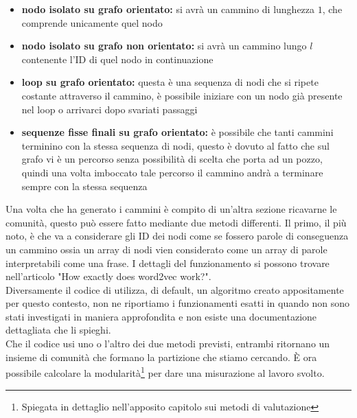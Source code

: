 \begin{itemize}
	\item \textbf{nodo isolato su grafo orientato:} si avrà un cammino di lunghezza $1$, che comprende unicamente quel nodo
	\item \textbf{nodo isolato su grafo non orientato:} si avrà un cammino lungo $l$ contenente l'ID di quel nodo in continuazione
	\item \textbf{loop su grafo orientato:} questa è una sequenza di nodi che si ripete costante attraverso il cammino, è possibile iniziare con un nodo già presente nel loop o arrivarci dopo svariati passaggi
	\item \textbf{sequenze fisse finali su grafo orientato:} è possibile che tanti cammini terminino con la stessa sequenza di nodi, questo è dovuto al fatto che sul grafo vi è un percorso senza possibilità di scelta che porta ad un pozzo, quindi una volta imboccato tale percorso il cammino andrà a terminare sempre con la stessa sequenza
\end{itemize}
%
Una volta che \nv ha generato i cammini è compito di un'altra sezione ricavarne le comunità, questo può essere fatto mediante due metodi differenti. Il primo, il più noto, è \wv che va a considerare gli ID dei nodi come se fossero parole di conseguenza un cammino ossia un array di nodi vien considerato come un array di parole interpretabili come una frase. I dettagli del funzionamento si possono trovare nell'articolo "How exactly does word2vec work?"\cite{meyer2016exactly}.\\
Diversamente il codice di \cnrl utilizza, di default, un algoritmo creato appositamente per questo contesto, non ne riportiamo i funzionamenti esatti in quando non sono stati investigati in maniera approfondita e non esiste una documentazione dettagliata che li spieghi.\\
Che il codice usi uno o l'altro dei due metodi previsti, entrambi ritornano un insieme di comunità che formano la partizione che stiamo cercando. È ora possibile calcolare la modularità\footnote{Spiegata in dettaglio nell'apposito capitolo sui metodi di valutazione} per dare una misurazione al lavoro svolto.
%
